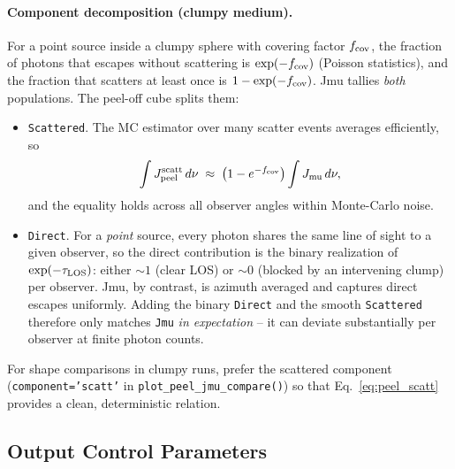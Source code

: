 \documentclass[english,a4paper]{my_memo}
\begin{document}
\paragraph{Component decomposition (clumpy medium).}
For a point source inside a clumpy sphere with covering factor
$f_{\rm cov}$, the fraction of photons that escapes without scattering
is $\exp(-f_{\rm cov})$ (Poisson statistics), and the fraction that
scatters at least once is $1-\exp(-f_{\rm cov})$.  Jmu tallies
\emph{both} populations.  The peel-off cube splits them:
\begin{itemize}
  \item \texttt{Scattered}.  The MC estimator over many scatter events
        averages efficiently, so
        \begin{equation}
          \int J_{\rm peel}^{\rm scatt}\,d\nu
          \;\approx\;
          \bigl(1-e^{-f_{\rm cov}}\bigr)\int J_{\rm mu}\,d\nu,
          \label{eq:peel_scatt}
        \end{equation}
        and the equality holds across all observer angles within Monte-Carlo
        noise.
  \item \texttt{Direct}.  For a \emph{point} source, every photon shares
        the same line of sight to a given observer, so the direct
        contribution is the binary realization of $\exp(-\tau_{\rm LOS})$:
        either $\sim\!1$ (clear LOS) or $\sim\!0$ (blocked by an
        intervening clump) per observer.  Jmu, by contrast, is azimuth
        averaged and captures direct escapes uniformly.  Adding the
        binary \texttt{Direct} and the smooth \texttt{Scattered} therefore
        only matches \texttt{Jmu} \emph{in expectation} -- it can deviate
        substantially per observer at finite photon counts.
\end{itemize}
\begin{sloppypar}
For shape comparisons in clumpy runs, prefer the scattered component
(\texttt{component='scatt'} in
\texttt{plot\_peel\_jmu\_compare()}) so that
Eq.~\eqref{eq:peel_scatt} provides a clean, deterministic relation.
\end{sloppypar}

\subsection{Output Control Parameters}
\end{document}
